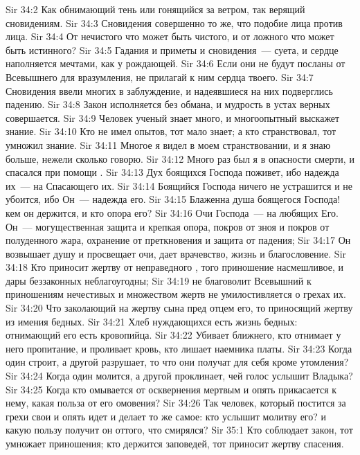 \vs Sir 34:2 Как обнимающий тень или гонящийся за ветром, так верящий сновидениям.
\vs Sir 34:3 Сновидения совершенно то же, что подобие лица против лица.
\vs Sir 34:4 От нечистого что может быть чистого, и от ложного что может быть истинного?
\vs Sir 34:5 Гадания и приметы и сновидения~--- суета, и сердце наполняется мечтами, как у рождающей.
\vs Sir 34:6 Если они не будут посланы от Всевышнего для вразумления, не прилагай к ним сердца твоего.
\vs Sir 34:7 Сновидения ввели многих в заблуждение, и надеявшиеся на них подверглись падению.
\vs Sir 34:8 Закон исполняется без обмана, и мудрость в устах верных совершается.
\vs Sir 34:9 Человек ученый знает много, и многоопытный выскажет знание.
\vs Sir 34:10 Кто не имел опытов, тот мало знает; а кто странствовал, тот умножил знание.
\vs Sir 34:11 Многое я видел в моем странствовании, и я знаю больше, нежели сколько говорю.
\vs Sir 34:12 Много раз был я в опасности смерти, и спасался при помощи .
\vs Sir 34:13 Дух боящихся Господа поживет, ибо надежда их~--- на Спасающего их.
\vs Sir 34:14 Боящийся Господа ничего не устрашится и не убоится, ибо Он~--- надежда его.
\vs Sir 34:15 Блаженна душа боящегося Господа! кем он держится, и кто опора его?
\vs Sir 34:16 Очи Господа~--- на любящих Его. Он~--- могущественная защита и крепкая опора, покров от зноя и покров от полуденного жара, охранение от преткновения и защита от падения;
\vs Sir 34:17 Он возвышает душу и просвещает очи, дает врачевство, жизнь и благословение.
\rsbpar\vs Sir 34:18 Кто приносит жертву от неправедного , того приношение насмешливое, и дары беззаконных неблагоугодны;
\vs Sir 34:19 не благоволит Всевышний к приношениям нечестивых и множеством жертв не умилостивляется о грехах их.
\vs Sir 34:20 Что заколающий на жертву сына пред отцем его, то приносящий жертву из имения бедных.
\vs Sir 34:21 Хлеб нуждающихся есть жизнь бедных: отнимающий его есть кровопийца.
\vs Sir 34:22 Убивает ближнего, кто отнимает у него пропитание, и проливает кровь, кто лишает наемника платы.
\vs Sir 34:23 Когда один строит, а другой разрушает, то что они получат для себя кроме утомления?
\vs Sir 34:24 Когда один молится, а другой проклинает, чей голос услышит Владыка?
\vs Sir 34:25 Когда кто омывается от осквернения мертвым и опять прикасается к нему, какая польза от его омовения?
\vs Sir 34:26 Так человек, который постится за грехи свои и опять идет и делает то же самое: кто услышит молитву его? и какую пользу получит он оттого, что смирялся?
\vs Sir 35:1 Кто соблюдает закон, тот умножает приношения; кто держится заповедей, тот приносит жертву спасения.
